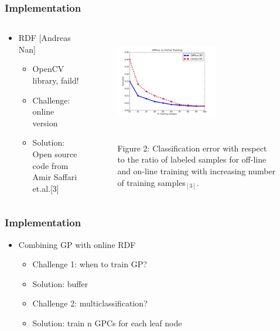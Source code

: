 \documentclass[mathserif]{beamer}
\begin{document}
\begin{frame}
\frametitle{Implementation}

\begin{columns}[t]
\begin{column}{0.5\linewidth}
\begin{itemize}
\item  RDF [Andreas Nan]
\begin{itemize}
\item OpenCV library, faild! 
\item Challenge: online version
\item Solution: Open source code from Amir Saffari et.al.[3]
\end{itemize}
\end{itemize}
\end{column}

\begin{column}{0.5\linewidth}
\begin{figure}[t]
\centering
\includegraphics[width=4.5cm,height=4.5cm]{rdf_perf_onoff}

\scriptsize{Figure 2: Classification error with respect to the ratio of labeled samples for off-line and on-line training with increasing number of training samples$_{[3]}$.}
\label{fig2}
\end{figure}
\end{column}
\end{columns}

\end{frame}
\begin{frame}
\frametitle{Implementation}

\begin{itemize}
\item Combining GP with online RDF
\begin{itemize}
\item Challenge 1:  when to train GP?
\item Solution:  buffer
\item Challenge 2:  multiclassification?
\item Solution:  train n GPCs for each leaf node
\end{itemize}
\end{itemize}

\end{frame}
\end{document}
